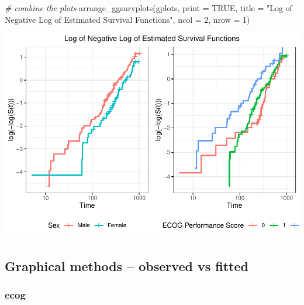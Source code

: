 \documentclass[
]{article}
\newenvironment{Shaded}{\begin{snugshade}}{\end{snugshade}}
\newcommand{\AttributeTok}[1]{\textcolor[rgb]{0.77,0.63,0.00}{#1}}
\newcommand{\CommentTok}[1]{\textcolor[rgb]{0.56,0.35,0.01}{\textit{#1}}}
\newcommand{\ConstantTok}[1]{\textcolor[rgb]{0.00,0.00,0.00}{#1}}
\newcommand{\DecValTok}[1]{\textcolor[rgb]{0.00,0.00,0.81}{#1}}
\newcommand{\FunctionTok}[1]{\textcolor[rgb]{0.00,0.00,0.00}{#1}}
\newcommand{\NormalTok}[1]{#1}
\newcommand{\StringTok}[1]{\textcolor[rgb]{0.31,0.60,0.02}{#1}}
\begin{document}
\begin{Shaded}
\begin{Highlighting}[]
\CommentTok{\# combine the plots}
\FunctionTok{arrange\_ggsurvplots}\NormalTok{(gplots, }
                    \AttributeTok{print =} \ConstantTok{TRUE}\NormalTok{,}
                    \AttributeTok{title =} \StringTok{"Log of Negative Log of Estimated Survival Functions"}\NormalTok{,}
                    \AttributeTok{ncol =} \DecValTok{2}\NormalTok{, }
                    \AttributeTok{nrow =} \DecValTok{1}\NormalTok{)}
\end{Highlighting}
\end{Shaded}

\includegraphics{final_project_files/figure-latex/unnamed-chunk-35-1.pdf}

\hypertarget{graphical-methods-observed-vs-fitted}{%
\subsection{Graphical methods -- observed vs
fitted}\label{graphical-methods-observed-vs-fitted}}

\hypertarget{ecog}{%
\subsubsection{ecog}\label{ecog}}
\end{document}

